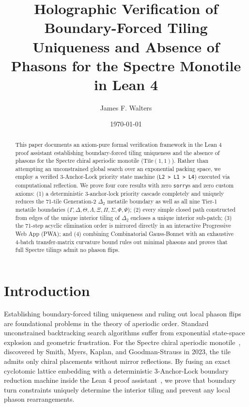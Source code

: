 \documentclass[11pt,a4paper]{article}
\title{Holographic Verification of Boundary-Forced Tiling Uniqueness and Absence of Phasons for the Spectre Monotile in Lean 4}
\author{James F. Walters}
\date{\today}
\begin{document}
\sloppy
\maketitle

\begin{abstract}
This paper documents an axiom-pure formal verification framework in the Lean 4 proof assistant establishing boundary-forced tiling uniqueness and the absence of phasons for the Spectre chiral aperiodic monotile ($\mathrm{Tile}(1,1)$). Rather than attempting an unconstrained global search over an exponential packing space, we employ a verified 3-Anchor-Lock priority state machine (\texttt{L2 > L1 > L4}) executed via computational reflection. We prove four core results with zero \texttt{sorry}s and zero custom axioms: (1) a deterministic 3-anchor-lock priority cascade completely and uniquely reduces the 71-tile Generation-2 $\Delta_2$ metatile boundary as well as all nine Tier-1 metatile boundaries ($\Gamma, \Delta, \Theta, \Lambda, \Xi, \Pi, \Sigma, \Phi, \Psi$); (2) every simple closed path constructed from edges of the unique interior tiling of $\Delta_2$ encloses a unique interior sub-patch; (3) the 71-step acyclic elimination order is mirrored directly in an interactive Progressive Web App (PWA); and (4) combining Combinatorial Gauss-Bonnet with an exhaustive 4-batch transfer-matrix curvature bound rules out minimal phasons and proves that full Spectre tilings admit no phason flips.
\end{abstract}

\section{Introduction}
\label{sec:intro}
Establishing boundary-forced tiling uniqueness and ruling out local phason flips are foundational problems in the theory of aperiodic order. Standard unconstrained backtracking search algorithms suffer from exponential state-space explosion and geometric frustration. For the Spectre chiral aperiodic monotile~\cite{smith2023chiral}, discovered by Smith, Myers, Kaplan, and Goodman-Strauss in 2023, the tile admits only chiral placements without mirror reflections. By fusing an exact cyclotomic lattice embedding with a deterministic 3-Anchor-Lock boundary reduction machine inside the Lean 4 proof assistant~\cite{moura2021lean4}, we prove that boundary turn constraints uniquely determine the interior tiling and prevent any local phason rearrangements.
\end{document}
